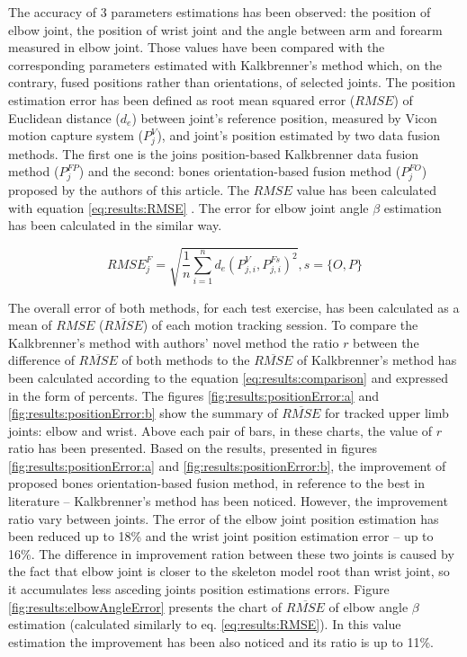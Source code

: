 \documentclass[sensors,article,submit,moreauthors,pdftex,10pt,a4paper]{mdpi}
\begin{document}
	The accuracy of 3 parameters estimations has been observed: the position of elbow joint, the position of wrist joint and the angle between arm and forearm measured in elbow joint. Those values have been compared with the corresponding parameters estimated with Kalkbrenner’s method \cite{Kalkbrenner2014} which, on the contrary, fused positions rather than orientations, of selected joints. The position estimation error has been defined as root mean squared error ($RMSE$) of Euclidean distance ($d_e$) between joint’s reference position, measured by Vicon motion capture system ($P_j^V$), and joint’s position estimated by two data fusion methods. The first one is the joins position-based Kalkbrenner data fusion method ($P_j^{FP}$) and the second: bones orientation-based fusion method ($P_j^{FO}$) proposed by the authors of this article. The $RMSE$ value has been calculated with equation \ref{eq:results:RMSE} \cite{Armstrong1992}. The error for elbow joint angle $\beta$ estimation has been calculated in the similar way.
	
	\begin{equation}
		{RMSE}^F_j = \sqrt{\frac{1}{n}\sum_{i=1}^{n}{d_e(P^V_{j,i}, P^{Fs}_{j,i})^2}} , s = \{O,P\}
		\label{eq:results:RMSE}
	\end{equation}
	
	The overall error of both methods, for each test exercise, has been calculated as a mean of $RMSE$ ($\overline{RMSE}$) of each motion tracking session. To compare the Kalkbrenner’s method with authors’ novel method the ratio $r$ between the difference of $\overline{RMSE}$ of both methods to the $\overline{RMSE}$ of Kalkbrenner’s method has been calculated according to the equation \ref{eq:results:comparison} and expressed in the form of percents. The figures \ref{fig:results:positionError:a} and \ref{fig:results:positionError:b} show the summary of  $\overline{RMSE}$ for tracked upper limb joints: elbow and wrist. Above each pair of bars, in these charts, the value of $r$ ratio has been presented. Based on the results, presented in figures \ref{fig:results:positionError:a} and \ref{fig:results:positionError:b}, the improvement of proposed bones orientation-based fusion method, in reference to the best in literature -- Kalkbrenner’s method has been noticed. However, the improvement ratio vary between joints. The error of the elbow joint position estimation has been reduced up to 18\% and the wrist joint position estimation error -- up to 16\%. The difference in improvement ration between these two joints is caused by the fact that elbow joint is closer to the skeleton model root than wrist joint, so it accumulates less asceding joints position estimations errors. Figure \ref{fig:results:elbowAngleError} presents the chart of $\overline{RMSE}$ of elbow angle $\beta$ estimation (calculated similarly to eq. \ref{eq:results:RMSE}). In this value estimation the improvement has been also noticed and its ratio is up to 11\%.
	
\end{document}
